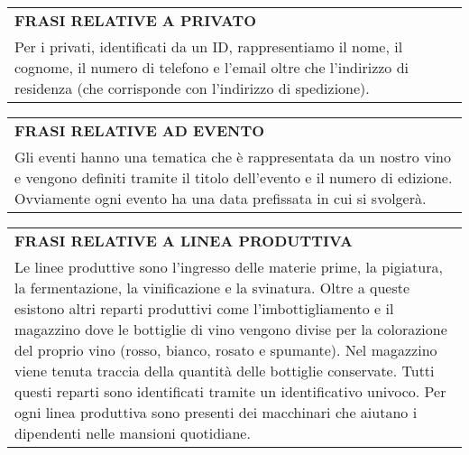 \begin{center}
	\vspace{0.5cm}

	\begin{tabular}{P{16cm}}
		\toprule
		 \textbf {\large {FRASI RELATIVE A PRIVATO}}                                                                                                                  \\
		Per i privati, identificati da un ID, rappresentiamo il nome, il cognome, il numero di telefono e l'email oltre che l'indirizzo di residenza (che corrisponde con l'indirizzo di spedizione). \\
		\bottomrule
	\end{tabular}

	\vspace{0.5cm}

	\begin{tabular}{P{16cm}}
		\toprule
		 \textbf {\large {FRASI RELATIVE AD EVENTO}}                                                                                                                                    \\
		Gli eventi hanno una tematica che è rappresentata da un nostro vino e vengono definiti tramite il titolo dell'evento e il numero di edizione. Ovviamente ogni evento ha una data prefissata in cui si svolgerà. \\
		\bottomrule
	\end{tabular}

	\vspace{0.5cm}

	\begin{tabular}{P{16cm}}
		\toprule
		 \textbf {\large {FRASI RELATIVE A LINEA PRODUTTIVA}}                                                                                                                                                                                                                                                                                                                                                                                                                                                                                                         \\
		Le linee produttive sono l'ingresso delle materie prime, la pigiatura, la fermentazione, la vinificazione e la svinatura. Oltre a queste esistono altri reparti produttivi come l'imbottigliamento e il magazzino dove le bottiglie di vino vengono divise per la colorazione del proprio vino (rosso, bianco, rosato e spumante). Nel magazzino viene tenuta traccia della quantità delle bottiglie conservate. Tutti questi reparti sono identificati tramite un identificativo univoco. Per ogni linea produttiva sono presenti dei macchinari che aiutano i dipendenti nelle mansioni quotidiane. \\
		\bottomrule
	\end{tabular}


\end{center}
